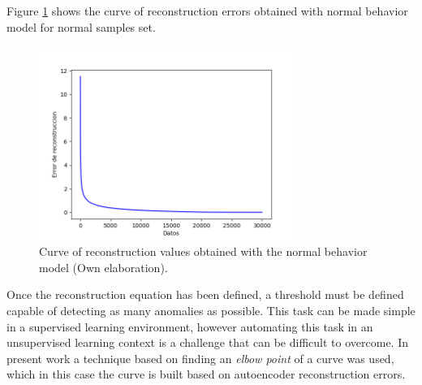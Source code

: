 Figure \ref{fig:codos} shows the curve of reconstruction errors obtained with normal behavior model for normal samples set.

\begin{figure}[H]
        \centering
            \includegraphics[width=0.75\textwidth, frame]{imagenes/Cap5/codos}
        \caption{Curve of reconstruction values obtained with the normal behavior model (Own elaboration).}
		\label{fig:codos}
    \end{figure}

Once the reconstruction equation has been defined, a threshold must be defined capable of detecting as many anomalies as possible. This task can be made simple in a supervised learning environment, however automating this task in an unsupervised learning context is a challenge that can be difficult to overcome. In present work a technique based on finding an \textit{elbow point} of a curve was used, which in this case the curve is built based on autoencoder reconstruction errors.

\vspace{5mm} %

